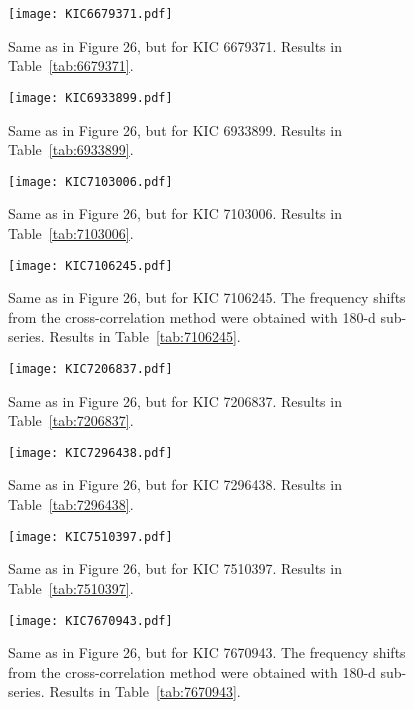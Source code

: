 \documentclass[twocolumn]{aastex61}%
\begin{document}
\begin{figure}[ht]
\texttt{[image: KIC6679371.pdf]}
\caption{Same as in Figure 26, but for KIC 6679371. Results in Table~\ref{tab:6679371}.}\label{fig:6679371}
\end{figure}

\begin{figure}[ht]
\texttt{[image: KIC6933899.pdf]}
\caption{Same as in Figure 26, but for KIC 6933899. Results in Table~\ref{tab:6933899}.}\label{fig:6933899}
\end{figure}

\begin{figure}[ht]
\texttt{[image: KIC7103006.pdf]}
\caption{Same as in Figure 26, but for KIC 7103006. Results in Table~\ref{tab:7103006}.}\label{fig:7103006}
\end{figure}

\begin{figure}[ht]
\texttt{[image: KIC7106245.pdf]}
\caption{Same as in Figure 26, but for KIC 7106245. The frequency shifts from the cross-correlation method were obtained with 180-d sub-series. Results in Table~\ref{tab:7106245}.}\label{fig:7106245}
\end{figure}

\begin{figure}[ht]
\texttt{[image: KIC7206837.pdf]}
\caption{Same as in Figure 26, but for KIC 7206837. Results in Table~\ref{tab:7206837}.}\label{fig:7206837}
\end{figure}

\begin{figure}[ht]
\texttt{[image: KIC7296438.pdf]}
\caption{Same as in Figure 26, but for KIC 7296438. Results in Table~\ref{tab:7296438}.}\label{fig:7296438}
\end{figure}

\begin{figure}[ht]
\texttt{[image: KIC7510397.pdf]}\vspace{-0.2cm}
\caption{Same as in Figure 26, but for KIC 7510397. Results in Table~\ref{tab:7510397}.}\label{fig:7510397}
\end{figure}

\begin{figure}[ht]
\texttt{[image: KIC7670943.pdf]}\vspace{-0.2cm}
\caption{Same as in Figure 26, but for KIC 7670943. The frequency shifts from the cross-correlation method were obtained with 180-d sub-series. Results in Table~\ref{tab:7670943}.}\label{fig:7670943}\vspace{-1.5cm}
\end{figure}
\end{document}

